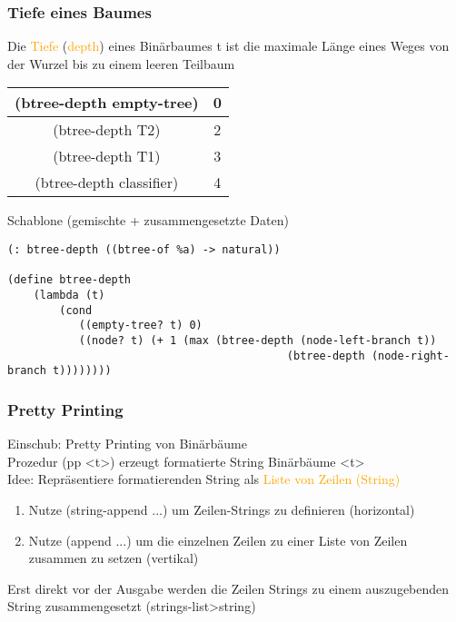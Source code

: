 \documentclass[paper=a4, fontsize=11pt]{scrartcl}
\numberwithin{equation}{section}
\numberwithin{figure}{section}
\numberwithin{table}{section}
\begin{document}
\begin{lstlistig}
\subsubsection{Tiefe eines Baumes}
Die \textcolor{orange}{Tiefe} (\textcolor{orange}{depth}) eines Binärbaumes t ist die maximale Länge eines Weges von der Wurzel bis zu einem leeren Teilbaum \\
\begin{tabular}{|c|c|}
\hline
(btree-depth empty-tree) & 0 \\\hline
(btree-depth T2) & 2 \\\hline
(btree-depth T1) & 3 \\\hline
(btree-depth classifier) & 4 \\\hline
\end{tabular}

Schablone (gemischte + zusammengesetzte Daten) \\

\begin{lstlisting}
(: btree-depth ((btree-of %a) -> natural))

(define btree-depth
    (lambda (t)
        (cond
           ((empty-tree? t) 0)
           ((node? t) (+ 1 (max (btree-depth (node-left-branch t))
                                           (btree-depth (node-right-branch t))))))))
\end{lstlisting}

\subsubsection{Pretty Printing}
Einschub: Pretty Printing von Binärbäume \\
Prozedur (pp <t>) erzeugt formatierte String Binärbäume <t> \\


Idee: Repräsentiere formatierenden String als \textcolor{orange}{Liste von Zeilen (String)} \\
\begin{enumerate}
\item Nutze (string-append ...) um Zeilen-Strings zu definieren (horizontal)
\item Nutze (append ...) um die einzelnen Zeilen zu einer Liste von Zeilen zusammen zu setzen (vertikal)
\end{enumerate}
Erst direkt vor der Ausgabe werden die Zeilen Strings zu einem auszugebenden String zusammengesetzt (strings-list>string)


\end{lstlistig}
\end{document}

